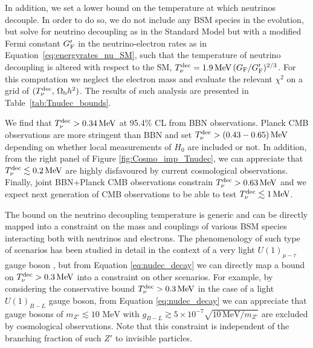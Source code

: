 \documentclass[notitlepage,letterpaper,natbib,aps,prd,onecolumn,amsmath,amsfonts,nofootinbib,preprintnumbers,superscriptaddress,secnumarabic,groupedaddress]{revtex4-1}
\begin{document}
In addition, we set a lower bound on the temperature at which neutrinos decouple. In order to do so, we do not include any BSM species in the evolution, but solve for neutrino decoupling as in the Standard Model but with a modified Fermi constant $G_{\rm F}'$ in the neutrino-electron rates as in Equation~\eqref{eq:energyrates_nu_SM}, such that the temperature of neutrino decoupling is altered with respect to the SM, $T_{\nu}^{\rm dec} = 1.9\,\text{MeV} \, ({G_{\rm F}}/{G_{\rm F}'})^{2/3}$. For this computation we neglect the electron mass and evaluate the relevant $\chi^2$ on a grid of $(T_{\nu}^{\rm dec},\,\Omega_\mathrm{b}h^2)$. The results of such analysis are presented in Table~\ref{tab:Tnudec_bounds}.

We find that $T_{\nu}^{\rm dec} > 0.34\,\text{MeV}$ at 95.4\% CL from BBN observations. Planck CMB observations are more stringent than BBN and set $T_{\nu}^{\rm dec} > (0.43-0.65)\,\text{MeV}$ depending on whether local measurements of $H_0$ are included or not. In addition, from the right panel of Figure \ref{fig:Cosmo_imp_Tnudec}, we can appreciate that $ T_{\nu}^{\rm dec} \lesssim 0.2\,\text{MeV}$ are highly disfavoured by current cosmological observations. Finally, joint BBN+Planck CMB observations constrain $T_{\nu}^{\rm dec} > 0.63\,\text{MeV}$ and we expect next generation of CMB observations to be able to test $T_{\nu}^{\rm dec} \lesssim 1\,\text{MeV}$.

The bound on the neutrino decoupling temperature is generic and can be directly mapped into a constraint on the mass and couplings of various BSM species interacting both with neutrinos and electrons. The phenomenology of such type of scenarios has been studied in detail in the context of a very light $U(1)_{\mu-\tau}$ gauge boson \cite{Escudero:2019gzq}, but from Equation \eqref{eq:nudec_decay} we can directly map a bound on $T_{\nu}^{\rm dec}> 0.3\,\text{MeV}$ into a constraint on other scenarios. For example, by considering the conservative bound $T_{\nu}^{\rm dec}> 0.3\,\text{MeV}$ in the case of a light $U(1)_{B-L}$ gauge boson, from Equation \eqref{eq:nudec_decay} we can appreciate that gauge bosons of $m_{Z'} \lesssim 10 \, \,\text{MeV}$ with $g_{B-L} \gtrsim  5 \times 10^{-7} \sqrt{10\,\text{MeV}/m_{Z'}}$ are excluded by cosmological observations. Note that this constraint is independent of the branching fraction of such $Z'$ to invisible particles.
\end{document}
